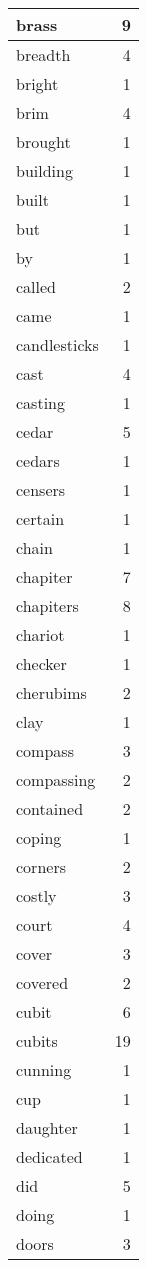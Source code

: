 \begin{center}
\begin{longtable}{l|r}
brass & 9 \\ \hline
breadth & 4 \\ \hline
bright & 1 \\ \hline
brim & 4 \\ \hline
brought & 1 \\ \hline
building & 1 \\ \hline
built & 1 \\ \hline
but & 1 \\ \hline
by & 1 \\ \hline
called & 2 \\ \hline
came & 1 \\ \hline
candlesticks & 1 \\ \hline
cast & 4 \\ \hline
casting & 1 \\ \hline
cedar & 5 \\ \hline
cedars & 1 \\ \hline
censers & 1 \\ \hline
certain & 1 \\ \hline
chain & 1 \\ \hline
chapiter & 7 \\ \hline
chapiters & 8 \\ \hline
chariot & 1 \\ \hline
checker & 1 \\ \hline
cherubims & 2 \\ \hline
clay & 1 \\ \hline
compass & 3 \\ \hline
compassing & 2 \\ \hline
contained & 2 \\ \hline
coping & 1 \\ \hline
corners & 2 \\ \hline
costly & 3 \\ \hline
court & 4 \\ \hline
cover & 3 \\ \hline
covered & 2 \\ \hline
cubit & 6 \\ \hline
cubits & 19 \\ \hline
cunning & 1 \\ \hline
cup & 1 \\ \hline
daughter & 1 \\ \hline
dedicated & 1 \\ \hline
did & 5 \\ \hline
doing & 1 \\ \hline
doors & 3 \\ \hline

\end{longtable}
\end{center}

